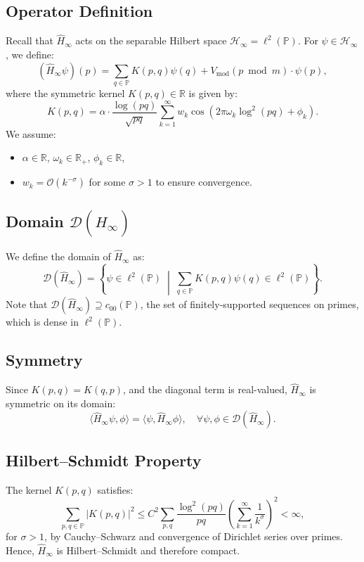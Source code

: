 \subsection*{Operator Definition}
Recall that \( \hat{H}_\infty \) acts on the separable Hilbert space \( \mathcal{H}_\infty = \ell^2(\mathbb{P}) \). For \( \psi \in \mathcal{H}_\infty \), we define:
\[
(\hat{H}_\infty \psi)(p) = \sum_{q \in \mathbb{P}} K(p, q)\psi(q) + V_{\text{mod}}(p \bmod m) \cdot \psi(p),
\]
where the symmetric kernel \( K(p, q) \in \mathbb{R} \) is given by:
\[
K(p, q) = \alpha \cdot \frac{\log(pq)}{\sqrt{pq}} \sum_{k=1}^\infty w_k \cos\left(2\pi \omega_k \log^2(pq) + \phi_k\right).
\]
We assume:
\begin{itemize}
    \item \( \alpha \in \mathbb{R} \), \( \omega_k \in \mathbb{R}_+ \), \( \phi_k \in \mathbb{R} \),
    \item \( w_k = \mathcal{O}(k^{-\sigma}) \) for some \( \sigma > 1 \) to ensure convergence.
\end{itemize}

\subsection*{Domain \( \mathcal{D}(\hat{H}_\infty) \)}
We define the domain of \( \hat{H}_\infty \) as:
\[
\mathcal{D}(\hat{H}_\infty) = \left\{ \psi \in \ell^2(\mathbb{P}) \;\middle|\; \sum_{q \in \mathbb{P}} K(p, q)\psi(q) \in \ell^2(\mathbb{P}) \right\}.
\]
Note that \( \mathcal{D}(\hat{H}_\infty) \supseteq c_{00}(\mathbb{P}) \), the set of finitely-supported sequences on primes, which is dense in \( \ell^2(\mathbb{P}) \).

\subsection*{Symmetry}
Since \( K(p, q) = K(q, p) \), and the diagonal term is real-valued, \( \hat{H}_\infty \) is symmetric on its domain:
\[
\langle \hat{H}_\infty \psi, \phi \rangle = \langle \psi, \hat{H}_\infty \phi \rangle, \quad \forall \psi, \phi \in \mathcal{D}(\hat{H}_\infty).
\]

\subsection*{Hilbert--Schmidt Property}
The kernel \( K(p, q) \) satisfies:
\[
\sum_{p,q \in \mathbb{P}} |K(p, q)|^2 \leq C^2 \sum_{p,q} \frac{\log^2(pq)}{pq} \left(\sum_{k=1}^\infty \frac{1}{k^\sigma}\right)^2 < \infty,
\]
for \( \sigma > 1 \), by Cauchy–Schwarz and convergence of Dirichlet series over primes. Hence, \( \hat{H}_\infty \) is Hilbert--Schmidt and therefore compact.

